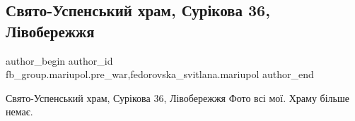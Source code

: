  
 
 
 
 

\subsection{Свято-Успенський храм, Сурікова 36, Лівобережжя}
\label{sec:16_03_2023.fb.fb_group.mariupol.pre_war.2.svyato_uspenskii_khr}
 
\ifcmt
 author_begin
   author_id fb_group.mariupol.pre_war,fedorovska_svitlana.mariupol
 author_end
\fi

Свято-Успенський храм, Сурікова 36, Лівобережжя Фото всі мої. Храму більше немає.
